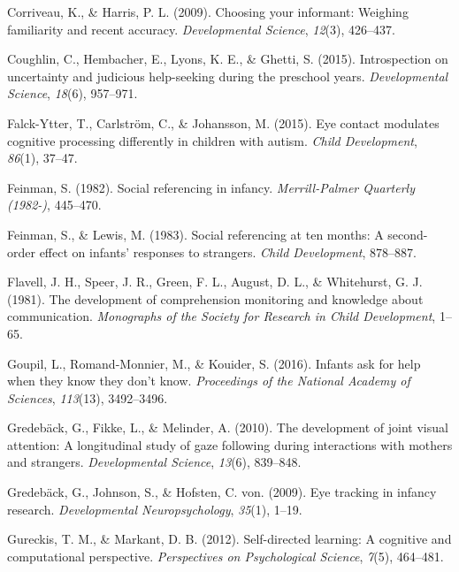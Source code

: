 \documentclass[floatsintext,man]{apa6}
\theoremstyle{definition}
\theoremstyle{definition}
\theoremstyle{definition}
\theoremstyle{remark}
\begin{document}
\hypertarget{ref-corriveau2009choosing}{}
Corriveau, K., \& Harris, P. L. (2009). Choosing your informant:
Weighing familiarity and recent accuracy. \emph{Developmental Science},
\emph{12}(3), 426--437.

\hypertarget{ref-coughlin2015introspection}{}
Coughlin, C., Hembacher, E., Lyons, K. E., \& Ghetti, S. (2015).
Introspection on uncertainty and judicious help-seeking during the
preschool years. \emph{Developmental Science}, \emph{18}(6), 957--971.

\hypertarget{ref-falck2015eye}{}
Falck-Ytter, T., Carlström, C., \& Johansson, M. (2015). Eye contact
modulates cognitive processing differently in children with autism.
\emph{Child Development}, \emph{86}(1), 37--47.

\hypertarget{ref-feinman1982social}{}
Feinman, S. (1982). Social referencing in infancy. \emph{Merrill-Palmer
Quarterly (1982-)}, 445--470.

\hypertarget{ref-feinman1983social}{}
Feinman, S., \& Lewis, M. (1983). Social referencing at ten months: A
second-order effect on infants' responses to strangers. \emph{Child
Development}, 878--887.

\hypertarget{ref-flavell1981development}{}
Flavell, J. H., Speer, J. R., Green, F. L., August, D. L., \&
Whitehurst, G. J. (1981). The development of comprehension monitoring
and knowledge about communication. \emph{Monographs of the Society for
Research in Child Development}, 1--65.

\hypertarget{ref-goupil2016infants}{}
Goupil, L., Romand-Monnier, M., \& Kouider, S. (2016). Infants ask for
help when they know they don't know. \emph{Proceedings of the National
Academy of Sciences}, \emph{113}(13), 3492--3496.

\hypertarget{ref-gredeback2010development}{}
Gredebäck, G., Fikke, L., \& Melinder, A. (2010). The development of
joint visual attention: A longitudinal study of gaze following during
interactions with mothers and strangers. \emph{Developmental Science},
\emph{13}(6), 839--848.

\hypertarget{ref-gredeback2009eye}{}
Gredebäck, G., Johnson, S., \& Hofsten, C. von. (2009). Eye tracking in
infancy research. \emph{Developmental Neuropsychology}, \emph{35}(1),
1--19.

\hypertarget{ref-gureckis2012self}{}
Gureckis, T. M., \& Markant, D. B. (2012). Self-directed learning: A
cognitive and computational perspective. \emph{Perspectives on
Psychological Science}, \emph{7}(5), 464--481.
\end{document}
